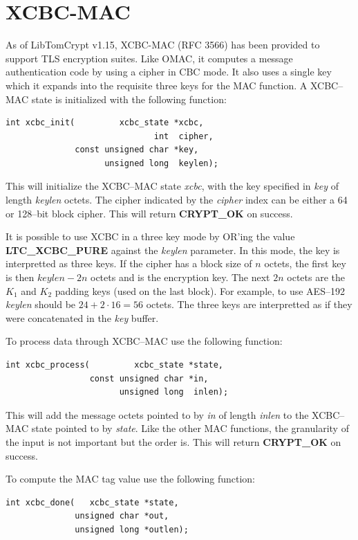 \documentclass[synpaper]{book}
\newcommand{\mysection}[1]    %
	{                   %
	\section{#1}
   \markboth{\textsf{www.libtom.net}}{\thesection ~ {#1}}
	}
\begin{document}
\mysection{XCBC-MAC}
As of LibTomCrypt v1.15, XCBC-MAC (RFC 3566) has been provided to support TLS encryption suites.  Like OMAC, it computes a message authentication code
by using a cipher in CBC mode.  It also uses a single key which it expands into the requisite three keys for the MAC function.  A XCBC--MAC state is
initialized with the following function:

\begin{verbatim}
int xcbc_init(         xcbc_state *xcbc,
                              int  cipher,
              const unsigned char *key,
                    unsigned long  keylen);
\end{verbatim}

This will initialize the XCBC--MAC state \textit{xcbc}, with the key specified in \textit{key} of length \textit{keylen} octets.  The cipher indicated
by the \textit{cipher} index can be either a 64 or 128--bit block cipher.  This will return \textbf{CRYPT\_OK} on success.

It is possible to use XCBC in a three key mode by OR'ing the value \textbf{LTC\_XCBC\_PURE} against the \textit{keylen} parameter.  In this mode, the key is
interpretted as three keys.  If the cipher has a block size of $n$ octets, the first key is then $keylen - 2n$ octets and is the encryption key.  The next
$2n$ octets are the $K_1$ and $K_2$ padding keys (used on the last block).  For example, to use AES--192 \textit{keylen} should be $24 + 2 \cdot 16 = 56$ octets.
The three keys are interpretted as if they were concatenated in the \textit{key} buffer.


To process data through XCBC--MAC use the following function:

\begin{verbatim}
int xcbc_process(         xcbc_state *state,
                 const unsigned char *in,
                       unsigned long  inlen);
\end{verbatim}

This will add the message octets pointed to by \textit{in} of length \textit{inlen} to the XCBC--MAC state pointed to by \textit{state}.  Like the other MAC functions,
the granularity of the input is not important but the order is.  This will return \textbf{CRYPT\_OK} on success.

To compute the MAC tag value use the following function:

\begin{verbatim}
int xcbc_done(   xcbc_state *state,
              unsigned char *out,
              unsigned long *outlen);
\end{verbatim}
\end{document}
